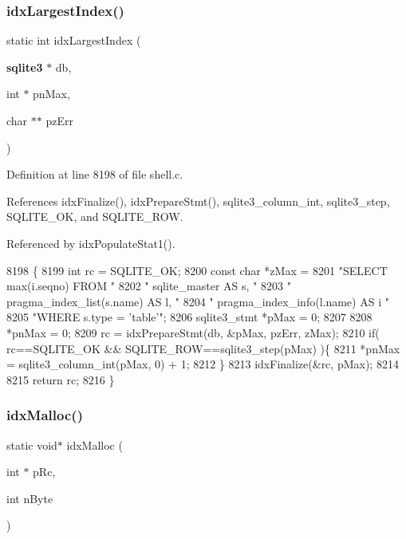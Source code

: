 \subsubsection{idx\+Largest\+Index()}
{\footnotesize\ttfamily static int idx\+Largest\+Index (\begin{DoxyParamCaption}\item[{\textbf{ sqlite3} $\ast$}]{db,  }\item[{int $\ast$}]{pn\+Max,  }\item[{char $\ast$$\ast$}]{pz\+Err }\end{DoxyParamCaption})\hspace{0.3cm}{\ttfamily [static]}}



Definition at line 8198 of file shell.\+c.



References idx\+Finalize(), idx\+Prepare\+Stmt(), sqlite3\+\_\+column\+\_\+int, sqlite3\+\_\+step, S\+Q\+L\+I\+T\+E\+\_\+\+OK, and S\+Q\+L\+I\+T\+E\+\_\+\+R\+OW.



Referenced by idx\+Populate\+Stat1().


\begin{DoxyCode}
8198                                                                  \{
8199   \textcolor{keywordtype}{int} rc = SQLITE_OK;
8200   \textcolor{keyword}{const} \textcolor{keywordtype}{char} *zMax = 
8201     \textcolor{stringliteral}{"SELECT max(i.seqno) FROM "}
8202     \textcolor{stringliteral}{"  sqlite\_master AS s, "}
8203     \textcolor{stringliteral}{"  pragma\_index\_list(s.name) AS l, "}
8204     \textcolor{stringliteral}{"  pragma\_index\_info(l.name) AS i "}
8205     \textcolor{stringliteral}{"WHERE s.type = 'table'"};
8206   sqlite3_stmt *pMax = 0;
8207 
8208   *pnMax = 0;
8209   rc = idxPrepareStmt(db, &pMax, pzErr, zMax);
8210   \textcolor{keywordflow}{if}( rc==SQLITE_OK && SQLITE_ROW==sqlite3_step(pMax) )\{
8211     *pnMax = sqlite3_column_int(pMax, 0) + 1;
8212   \}
8213   idxFinalize(&rc, pMax);
8214 
8215   \textcolor{keywordflow}{return} rc;
8216 \}
\end{DoxyCode}
\mbox{\label{shell_8c_aff206e9b311f2086145512290034832c}} 
\subsubsection{idx\+Malloc()}
{\footnotesize\ttfamily static void$\ast$ idx\+Malloc (\begin{DoxyParamCaption}\item[{int $\ast$}]{p\+Rc,  }\item[{int}]{n\+Byte }\end{DoxyParamCaption})\hspace{0.3cm}{\ttfamily [static]}}



